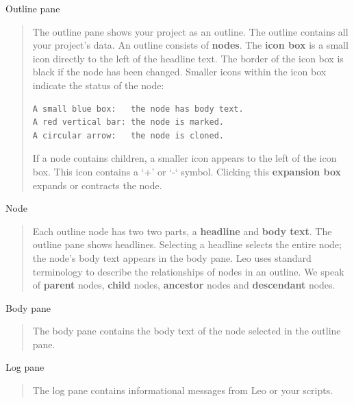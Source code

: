 \documentclass[a4paper,10pt,english]{sphinxmanual}
\begin{document}
Outline pane
\begin{quote}

The outline pane shows your project as an outline. The outline
contains all your project's data. An outline consists of \textbf{nodes}. The
\textbf{icon box} is a small icon directly to the left of the headline text.
The border of the icon box is black if the node has been changed.
Smaller icons within the icon box indicate the status of the node:

\begin{Verbatim}[commandchars=\\\{\}]
A small blue box:   the node has body text.
A red vertical bar: the node is marked.
A circular arrow:   the node is cloned.
\end{Verbatim}

If a node contains children, a smaller icon appears to the left of the icon
box. This icon contains a `+' or `-` symbol. Clicking this \textbf{expansion box}
expands or contracts the node.
\end{quote}

Node
\begin{quote}

Each outline node has two two parts, a \textbf{headline} and \textbf{body text}. The outline pane
shows headlines. Selecting a headline selects the entire node; the node's
body text appears in the body pane. Leo uses standard terminology to
describe the relationships of nodes in an outline. We speak of \textbf{parent}
nodes, \textbf{child} nodes, \textbf{ancestor} nodes and \textbf{descendant} nodes.
\end{quote}

Body pane
\begin{quote}

The body pane contains the body text of the node selected in the
outline pane.
\end{quote}

Log pane
\begin{quote}

The log pane contains informational messages from Leo or your scripts.
\end{quote}
\end{document}
